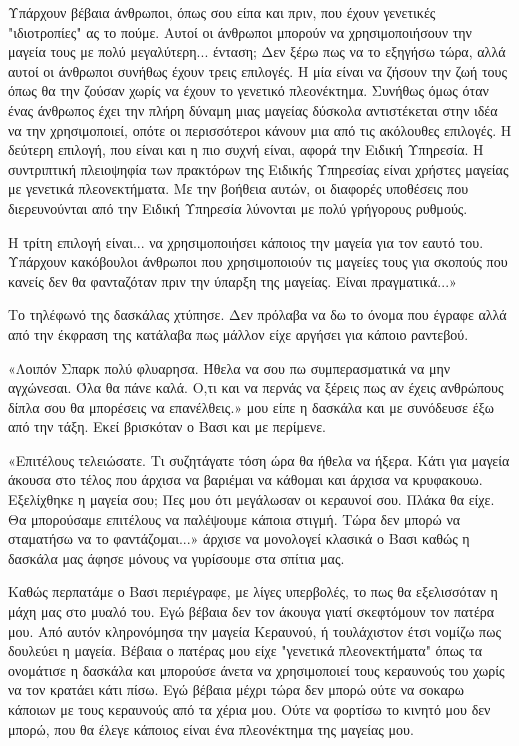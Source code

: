 \documentclass[12pt,twoside, openany]{book}
\begin{document}
Υπάρχουν βέβαια άνθρωποι, όπως σου είπα και πριν, που έχουν γενετικές "ιδιοτροπίες" ας το πούμε. Αυτοί οι άνθρωποι μπορούν να χρησιμοποιήσουν την μαγεία τους με πολύ μεγαλύτερη... ένταση; Δεν ξέρω πως να το εξηγήσω τώρα, αλλά αυτοί οι άνθρωποι συνήθως έχουν τρεις επιλογές. Η μία είναι να ζήσουν την ζωή τους όπως θα την ζούσαν χωρίς να έχουν το γενετικό πλεονέκτημα. Συνήθως όμως όταν ένας άνθρωπος έχει την πλήρη δύναμη μιας μαγείας δύσκολα αντιστέκεται στην ιδέα να την χρησιμοποιεί, οπότε οι περισσότεροι κάνουν μια από τις ακόλουθες επιλογές. Η δεύτερη επιλογή, που είναι και η πιο συχνή είναι, αφορά την Ειδική Υπηρεσία. Η συντριπτική πλειοψηφία των πρακτόρων της Ειδικής Υπηρεσίας είναι χρήστες μαγείας με γενετικά πλεονεκτήματα. Με την βοήθεια αυτών, οι διαφορές υποθέσεις που διερευνούνται από την Ειδική Υπηρεσία λύνονται με πολύ γρήγορους ρυθμούς. 

Η τρίτη επιλογή είναι... να χρησιμοποιήσει κάποιος την μαγεία για τον εαυτό του. Υπάρχουν κακόβουλοι άνθρωποι που χρησιμοποιούν τις μαγείες τους για σκοπούς που κανείς δεν θα φανταζόταν πριν την ύπαρξη της μαγείας. Είναι πραγματικά...»

Το τηλέφωνό της δασκάλας χτύπησε. Δεν πρόλαβα να δω το όνομα που έγραφε αλλά από την έκφραση της κατάλαβα πως μάλλον είχε αργήσει για κάποιο ραντεβού.

«Λοιπόν Σπαρκ πολύ φλυαρησα. Ήθελα να σου πω συμπερασματικά να μην αγχώνεσαι. Όλα θα πάνε καλά. Ο,τι και να περνάς να ξέρεις πως αν έχεις ανθρώπους δίπλα σου θα μπορέσεις να επανέλθεις.» μου είπε η δασκάλα και με συνόδευσε έξω από την τάξη. Εκεί  βρισκόταν ο Βασι και με περίμενε.

«Επιτέλους τελειώσατε. Τι συζητάγατε τόση ώρα θα ήθελα να ήξερα. Κάτι για μαγεία άκουσα στο τέλος που άρχισα να βαριέμαι να κάθομαι και άρχισα να κρυφακουω. Εξελίχθηκε η μαγεία σου; Πες μου ότι μεγάλωσαν οι κεραυνοί σου. Πλάκα θα είχε. Θα μπορούσαμε επιτέλους να παλέψουμε κάποια στιγμή. Τώρα δεν μπορώ να σταματήσω να το φαντάζομαι...» άρχισε να μονολογεί κλασικά ο Βασι καθώς η δασκάλα μας άφησε μόνους να γυρίσουμε στα σπίτια μας.

Καθώς περπατάμε ο Βασι περιέγραφε, με λίγες υπερβολές, το πως θα εξελισσόταν η μάχη μας στο μυαλό του. Εγώ βέβαια δεν τον άκουγα γιατί σκεφτόμουν τον πατέρα μου. Από αυτόν κληρονόμησα την μαγεία Κεραυνού, ή τουλάχιστον έτσι νομίζω πως δουλεύει η μαγεία. Βέβαια ο πατέρας μου είχε "γενετικά πλεονεκτήματα" όπως τα ονομάτισε η δασκάλα και μπορούσε άνετα να χρησιμοποιεί τους κεραυνούς του χωρίς να τον κρατάει κάτι πίσω. Εγώ βέβαια μέχρι τώρα δεν μπορώ ούτε να σοκαρω κάποιων με τους κεραυνούς από τα χέρια μου. Ούτε να φορτίσω το κινητό μου δεν μπορώ, που θα έλεγε κάποιος είναι ένα  πλεονέκτημα της μαγείας μου. 
\end{document}
